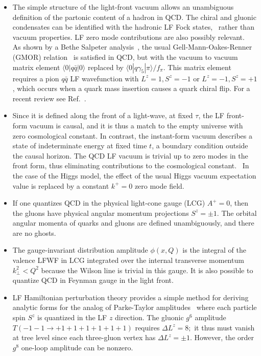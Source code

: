 \documentclass[prd,aps,onecolumn,nofootinbib]{revtex4}
\begin{document}
\begin{itemize}

\item
The simple structure of the light-front vacuum allows an unambiguous
definition of the partonic content of a hadron in QCD.  
The chiral and gluonic condensates can be identified with the  hadronic LF Fock states,~\cite{Casher:1974xd,Brodsky:2009zd} rather than vacuum properties.  LF zero mode contributions are also possibly relevant.~\cite{Banks:1979yr}  
As shown by a Bethe Salpeter analysis~\cite{Maris:1997tm}, the usual Gell-Mann-Oakes-Renner (GMOR) relation~\cite{GellMann:1968rz} is satisfied in QCD, but with the vacuum to vacuum matrix element $\langle 0|q \bar q|0 \rangle $ replaced by  $\langle 0|q \gamma_5|\pi \rangle/ f_\pi$.
This matrix element requires a pion $q \bar q$ LF  wavefunction  with
$L^z= 1, S^z=-1$  or    $L^z= -1, S^z=+1$, which occurs when a quark mass insertion causes a quark chiral flip.  
For a recent review see Ref.~\cite{Brodsky:2012ku}.


\item
Since it is defined along the front of a light-wave, at fixed $\tau$, the LF front-form vacuum is causal, and it is thus 
a match to the empty universe with zero cosmological constant. In contrast, the instant-form vacuum describes a state of indeterminate energy at fixed time $t$, a  boundary condition outside the causal horizon.
The QCD LF vacuum is trivial up to zero modes in the front form, thus eliminating contributions to the cosmological constant.~\cite{Brodsky:2009zd} 
In the case of the Higgs model, the effect of the usual Higgs vacuum expectation value is replaced by a constant $k^+=0$ zero mode field.~\cite{Srivastava:2002mw}  

\item
If one quantizes QCD in the physical light-cone gauge (LCG) $A^+ =0$, then the gluons have physical angular momentum projections $S^z= \pm 1$. The orbital angular momenta of quarks and gluons are defined unambiguously, and there are no ghosts.

\item
The gauge-invariant distribution amplitude $\phi(x,Q)$  is the integral of the valence LFWF in LCG integrated over the internal transverse momentum $k^2_\perp < Q^2$ because the Wilson line is trivial in this gauge. It is also possible to quantize QCD in  Feynman gauge in the light front.~\cite{Srivastava:1999gi}



\item
LF Hamiltonian perturbation theory provides a simple method for deriving analytic forms for the analog of Parke-Taylor amplitudes~\cite{Motyka:2009gi} where each particle spin $S^z$ is quantized in the LF $z$ direction.  The gluonic $g^6$ amplitude  $T(-1 -1 \to +1 +1 +1 +1 +1 +1)$  requires $\Delta L^z =8;$ it thus must vanish at tree level since each three-gluon vertex has  $\Delta L^z = \pm 1.$ However, the order $g^8$ one-loop amplitude can be nonzero.



\end{itemize}
\end{document}
